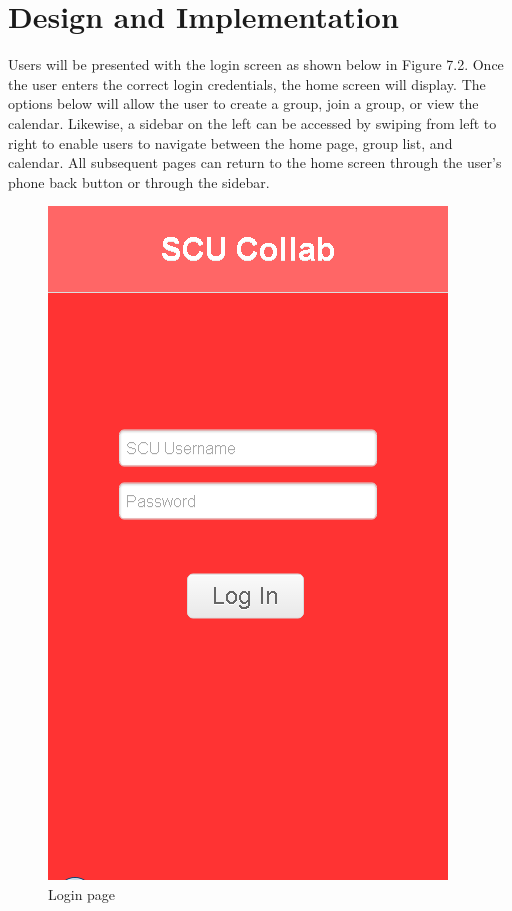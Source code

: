 \chapter{Design and Implementation}
Users will be presented with the login screen as shown below in Figure 7.2. Once the user enters the correct login credentials, the home screen will display. The options below will allow the user to create a group, join a group, or view the calendar. Likewise, a sidebar on the left can be accessed by swiping from left to right to enable users to navigate between the home page, group list, and calendar. All subsequent pages can return to the home screen through the user’s phone back button or through the sidebar.

\begin{figure}[h]
	\centering
	\includegraphics[scale=0.4]{images/login_screen.png}
	\caption{Login page}
	\label{fig:login screen}
\end{figure}

